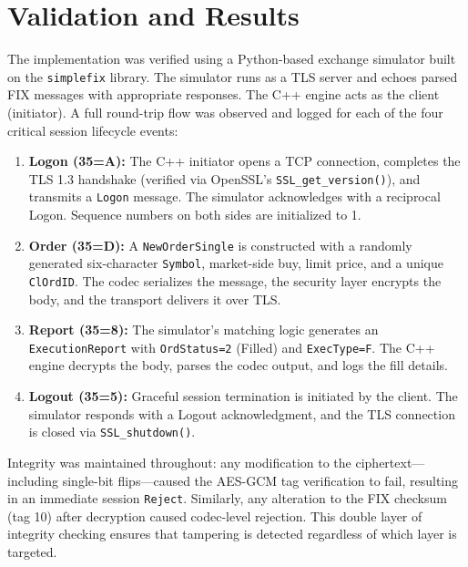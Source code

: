 \documentclass[twocolumn,10pt]{article}
\begin{document}
\section{Validation and Results}

The implementation was verified using a Python-based exchange simulator
built on the \texttt{simplefix} library. The simulator runs as a TLS server
and echoes parsed FIX messages with appropriate responses. The C++ engine
acts as the client (initiator). A full round-trip flow was observed and
logged for each of the four critical session lifecycle events:

\begin{enumerate}
    \item \textbf{Logon (35=A):} The C++ initiator opens a TCP connection,
    completes the TLS 1.3 handshake (verified via OpenSSL's
    \texttt{SSL\_get\_version()}), and transmits a \texttt{Logon} message.
    The simulator acknowledges with a reciprocal Logon. Sequence numbers
    on both sides are initialized to 1.

    \item \textbf{Order (35=D):} A \texttt{NewOrderSingle} is constructed
    with a randomly generated six-character \texttt{Symbol}, market-side
    buy, limit price, and a unique \texttt{ClOrdID}. The codec serializes
    the message, the security layer encrypts the body, and the transport
    delivers it over TLS.

    \item \textbf{Report (35=8):} The simulator's matching logic generates
    an \texttt{ExecutionReport} with \texttt{OrdStatus=2} (Filled) and
    \texttt{ExecType=F}. The C++ engine decrypts the body, parses the
    codec output, and logs the fill details.

    \item \textbf{Logout (35=5):} Graceful session termination is initiated
    by the client. The simulator responds with a Logout acknowledgment,
    and the TLS connection is closed via \texttt{SSL\_shutdown()}.
\end{enumerate}

Integrity was maintained throughout: any modification to the ciphertext—
including single-bit flips—caused the AES-GCM tag verification to fail,
resulting in an immediate session \texttt{Reject}. Similarly, any alteration
to the FIX checksum (tag 10) after decryption caused codec-level rejection.
This double layer of integrity checking ensures that tampering is detected
regardless of which layer is targeted.
\end{document}
